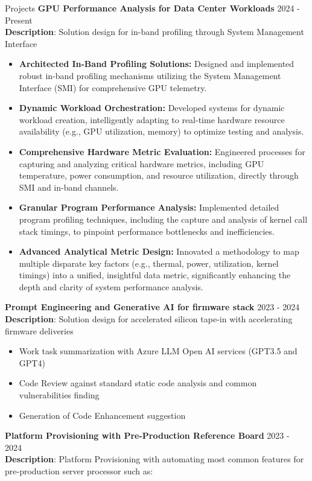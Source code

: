 \documentclass{resume} %
\begin{document}
\begin{rSection}{Projects}
{\bf GPU Performance Analysis for Data Center Workloads} \hfill {2024 - Present}\\
\textbf{Description}: Solution design for in-band profiling through System Management Interface

\begin{itemize}
    \item \textbf{Architected In-Band Profiling Solutions:} Designed and implemented robust in-band profiling mechanisms utilizing the System Management Interface (SMI) for comprehensive GPU telemetry.
    \item \textbf{Dynamic Workload Orchestration:} Developed systems for dynamic workload creation, intelligently adapting to real-time hardware resource availability (e.g., GPU utilization, memory) to optimize testing and analysis.
    \item \textbf{Comprehensive Hardware Metric Evaluation:} Engineered processes for capturing and analyzing critical hardware metrics, including GPU temperature, power consumption, and resource utilization, directly through SMI and in-band channels.
    \item \textbf{Granular Program Performance Analysis:} Implemented detailed program profiling techniques, including the capture and analysis of kernel call stack timings, to pinpoint performance bottlenecks and inefficiencies.
    \item \textbf{Advanced Analytical Metric Design:} Innovated a methodology to map multiple disparate key factors (e.g., thermal, power, utilization, kernel timings) into a unified, insightful data metric, significantly enhancing the depth and clarity of system performance analysis.
\end{itemize}

{\bf Prompt Engineering and Generative AI for firmware stack} \hfill {2023 - 2024}\\
\textbf{Description}: Solution design for accelerated silicon tape-in with accelerating firmware deliveries

\begin{itemize}
    \item Work task summarization with Azure LLM Open AI services (GPT3.5 and GPT4)
    \item Code Review against standard static code analysis and common vulnerabilities finding
    \item Generation of Code Enhancement suggestion 
\end{itemize}

\textbf{Platform Provisioning with Pre-Production Reference Board} \hfill {2023 - 2024}\\
\textbf{Description}: Platform Provisioning with automating most common features for pre-production server processor such as:


\end{rSection}
\end{document}
